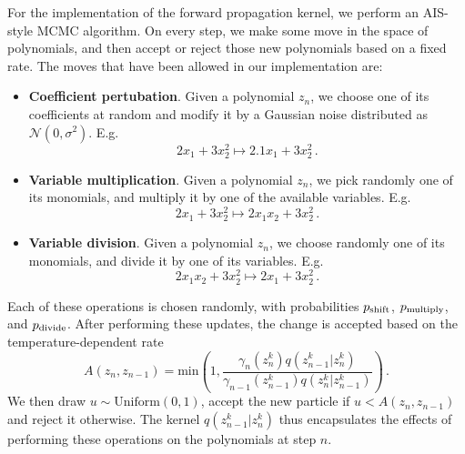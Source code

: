 \documentclass[11pt,a4paper]{article}
\newcommand{\gl}[1]{\marginpar{\parbox{\marginparwidth}{\boldmath $\Longleftarrow$}}{\boldmath\bfseries (gl: #1)}}
\begin{document}
		For the implementation of the forward propagation kernel, we perform an AIS-style MCMC algorithm. 
On every step, we make some move in the space of polynomials, and then accept or reject those new polynomials based on a fixed rate.
The moves that have been allowed in our implementation are:
		\begin{itemize}
			\item \textbf{Coefficient pertubation}. Given a polynomial $z_{n}$, we choose one of its coefficients at random and modify it by a Gaussian noise distributed as $\mathcal{N}(0,\sigma^2)$. E.g.
			\[
				2 x_1 + 3 x_2^2 \mapsto  2.1 x_1 + 3 x_2^2\,.
			\]
			\item \textbf{Variable multiplication}. Given a polynomial $z_{n}$, we pick randomly one of its monomials, and multiply it by one of the available variables. E.g.
			\[
				2 x_1 + 3 x_2^2 \mapsto  2 x_1 x_2 + 3 x_2^2\,.
			\]
			\item \textbf{Variable division}. Given a polynomial $z_{n}$, we choose randomly one of its monomials, and divide it by one of its variables. E.g.
			\[
				2 x_1 x_2 + 3 x_2^2 \mapsto  2 x_1 + 3 x_2^2\,.
			\]
		\end{itemize}
		Each of these operations is chosen randomly, with probabilities $p_{\rm shift}$, $p_{\rm multiply}$, and $p_{\rm divide}$.
After performing these updates, the change is accepted based on the temperature-dependent rate \gl{need to double check this}
		\begin{equation}\label{eq:acceptanceratio}
			A(z_n,z_{n-1}) = \mathrm{min} \left(1,\frac{ \gamma_n(z_n^k) q(z_{n-1}^k | z_n^k) }{ \gamma_{n-1}(z_{n-1}^k) q(z_n^k | z_{n-1}^k) }  \right)\,.
		\end{equation}
		We then draw $u\sim \mathrm{Uniform}(0,1)$, accept the new particle if $u<A(z_n,z_{n-1})$ and reject it otherwise.
		The kernel $q(z_{n-1}^k | z_n^k)$ thus encapsulates the effects of performing these operations on the polynomials at step $n$.
		
\end{document}
